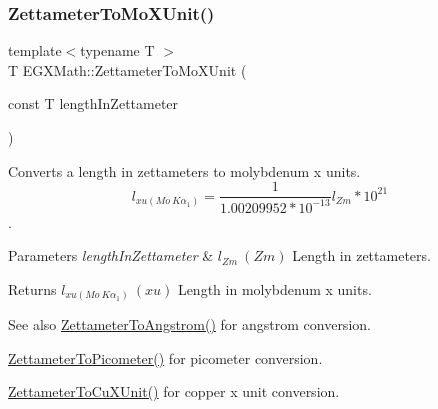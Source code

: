 \subsubsection{\texorpdfstring{Zettameter\+To\+Mo\+X\+Unit()}{ZettameterToMoXUnit()}}
{\footnotesize\ttfamily template$<$typename T $>$ \\
T E\+G\+X\+Math\+::\+Zettameter\+To\+Mo\+X\+Unit (\begin{DoxyParamCaption}\item[{const T}]{length\+In\+Zettameter }\end{DoxyParamCaption})}



Converts a length in zettameters to molybdenum x units. \[ l_{xu(Mo\ K\alpha_1)}=\frac{1}{1.00209952*10^{-13}} l_{Zm} * 10^{21}\]. 


\begin{DoxyParams}{Parameters}
{\em length\+In\+Zettameter} & $ l_{Zm}\ (Zm)$ Length in zettameters. \\
\hline
\end{DoxyParams}
\begin{DoxyReturn}{Returns}
$ l_{xu(Mo\ K\alpha_1)}\ (xu)$ Length in molybdenum x units. 
\end{DoxyReturn}
\begin{DoxySeeAlso}{See also}
\mbox{\hyperlink{group___e_g_x_math-_conversions-_length_conversions-_s_i-_zettameter-_non-_s_i_ga49d813ff9592fc1fc9a184436d0849fc}{Zettameter\+To\+Angstrom()}} for angstrom conversion. 

\mbox{\hyperlink{group___e_g_x_math-_conversions-_length_conversions-_s_i-_zettameter-_s_i_gae7835234c6727bbfd1e9ad40c54a4740}{Zettameter\+To\+Picometer()}} for picometer conversion. 

\mbox{\hyperlink{group___e_g_x_math-_conversions-_length_conversions-_s_i-_zettameter-_non-_s_i_ga91f2890d91086a45ad9d2b5e7e82b60a}{Zettameter\+To\+Cu\+X\+Unit()}} for copper x unit conversion. 
\end{DoxySeeAlso}
